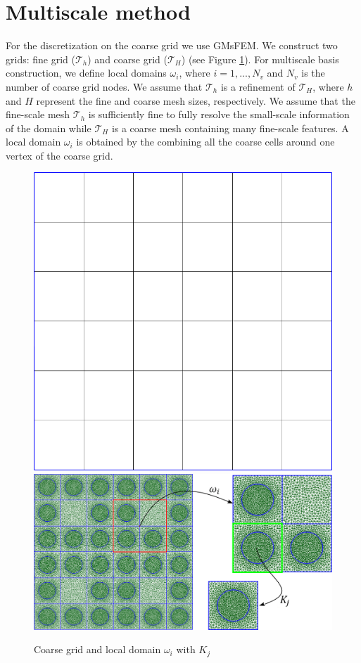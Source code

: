 \documentclass[runningheads]{llncs}
\begin{document}
\section{Multiscale method}
For the discretization on the coarse grid we use GMsFEM.
We construct two grids: fine grid ($\mathcal{T}_h$) and coarse grid ($\mathcal{T}_H$) (see Figure \ref{p1}). 
For multiscale basis construction, we define local domains $\omega_i$, where $i = 1,...,N_v$ and $N_v$ is the number of coarse grid nodes.
We assume that $\mathcal{T}_h$ is a refinement of $\mathcal{T}_H$, where $h$ and $H$ represent the fine and coarse mesh sizes, respectively. 
We assume that the fine-scale mesh $\mathcal{T}_h$ is sufficiently fine to fully resolve the small-scale information of the domain  while $\mathcal{T}_H$ is a coarse mesh containing many fine-scale features.
A local domain $\omega_i$ is obtained by the combining all the coarse cells around one vertex of the coarse grid. 

\begin{figure}[h!]
\centering
\includegraphics[width=0.26\linewidth]{coarse_grid.png}
\hspace{2em}
\includegraphics[width=0.5\linewidth]{omega.png} 
\caption{Coarse grid and local domain $\omega_i$ with $K_j$}
\label{p1}
\end{figure} 
\end{document}

